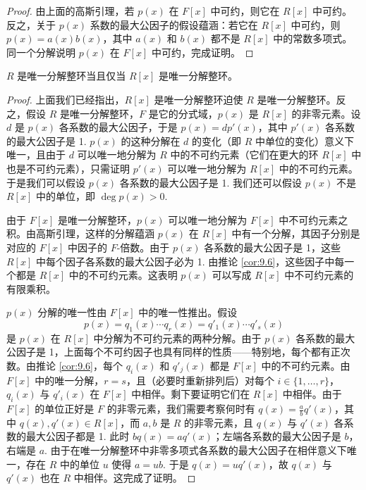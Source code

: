 \begin{proof}
由上面的高斯引理，若 \(p(x)\) 在 \(F[x]\) 中可约，则它在 \(R[x]\) 中可约。反之，关于 \(p(x)\) 系数的最大公因子的假设蕴涵：若它在 \(R[x]\) 中可约，则 \(p(x) = a(x)b(x)\)，其中 \(a(x)\) 和 \(b(x)\) 都不是 \(R[x]\) 中的常数多项式。同一个分解说明 \(p(x)\) 在 \(F[x]\) 中可约，完成证明。
\end{proof}

\begin{theorem}\label{thm:9.7}
\(R\) 是唯一分解整环当且仅当 \(R[x]\) 是唯一分解整环。
\end{theorem}

\begin{proof}
上面我们已经指出，\(R[x]\) 是唯一分解整环迫使 \(R\) 是唯一分解整环。反之，假设 \(R\) 是唯一分解整环，\(F\) 是它的分式域，\(p(x)\) 是 \(R[x]\) 的非零元素。设 \(d\) 是 \(p(x)\) 各系数的最大公因子，于是 \(p(x) = dp'(x)\)，其中 \(p'(x)\) 各系数的最大公因子是 1. \(p(x)\) 的这种分解在 \(d\) 的变化（即 \(R\) 中单位的变化）意义下唯一，且由于 \(d\) 可以唯一地分解为 \(R\) 中的不可约元素（它们在更大的环 \(R[x]\) 中也是不可约元素），只需证明 \(p'(x)\) 可以唯一地分解为 \(R[x]\) 中的不可约元素。于是我们可以假设 \(p(x)\) 各系数的最大公因子是 1. 我们还可以假设 \(p(x)\) 不是 \(R[x]\) 中的单位，即 \(\deg p(x) > 0\).

由于 \(F[x]\) 是唯一分解整环，\(p(x)\) 可以唯一地分解为 \(F[x]\) 中不可约元素之积。由高斯引理，这样的分解蕴涵 \(p(x)\) 在 \(R[x]\) 中有一个分解，其因子分别是对应的 \(F[x]\) 中因子的 \(F\)-倍数。由于 \(p(x)\) 各系数的最大公因子是 1，这些 \(R[x]\) 中每个因子各系数的最大公因子必为 1. 由推论 \ref{cor:9.6}，这些因子中每一个都是 \(R[x]\) 中的不可约元素。这表明 \(p(x)\) 可以写成 \(R[x]\) 中不可约元素的有限乘积。

\(p(x)\) 分解的唯一性由 \(F[x]\) 中的唯一性推出。假设
\[
p(x) = q_1(x)\cdots q_r(x) = q'_1(x)\cdots q'_s(x)
\]
是 \(p(x)\) 在 \(R[x]\) 中分解为不可约元素的两种分解。由于 \(p(x)\) 各系数的最大公因子是 1，上面每个不可约因子也具有同样的性质——特别地，每个都有正次数。由推论 \ref{cor:9.6}，每个 \(q_i(x)\) 和 \(q'_j(x)\) 都是 \(F[x]\) 中的不可约元素。由 \(F[x]\) 中的唯一分解，\(r = s\)，且（必要时重新排列后）对每个 \(i \in \{1, \ldots, r\}\)，\(q_i(x)\) 与 \(q'_i(x)\) 在 \(F[x]\) 中相伴。剩下要证明它们在 \(R[x]\) 中相伴。由于 \(F[x]\) 的单位正好是 \(F\) 的非零元素，我们需要考察何时有 \(q(x) = \frac{a}{b}q'(x)\)，其中 \(q(x), q'(x) \in R[x]\)，而 \(a, b\) 是 \(R\) 的非零元素，且 \(q(x)\) 与 \(q'(x)\) 各系数的最大公因子都是 1. 此时 \(bq(x) = aq'(x)\)；左端各系数的最大公因子是 \(b\)，右端是 \(a\). 由于在唯一分解整环中非零多项式各系数的最大公因子在相伴意义下唯一，存在 \(R\) 中的单位 \(u\) 使得 \(a = ub\). 于是 \(q(x) = uq'(x)\)，故 \(q(x)\) 与 \(q'(x)\) 也在 \(R\) 中相伴。这完成了证明。
\end{proof}

